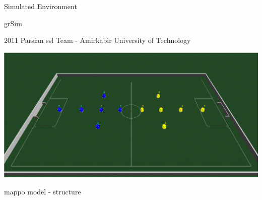 
\begin{frame}{Simulated Environment}
            
    grSim
            
    2011 Parsian \ac{ssl} Team - Amirkabir University of Technology

    \begin{adjustbox}{scale=0.8,center,margin={0cm,0cm,0cm,0cm}}
        \includegraphics[width=1\textwidth]{image/png/grSim.png}
    \end{adjustbox}
  
\end{frame}


\begin{frame}{\acf{mappo} model - structure}

    \begin{adjustbox}{scale=0.6,center,margin={0cm,0cm,0cm,0cm}}
        
    \end{adjustbox}
            
\end{frame}


\begin{frame}[plain]

    \begin{adjustbox}{scale=1,center,margin={0cm,0cm,0cm,0cm}}
    \end{adjustbox}
    
\end{frame}

